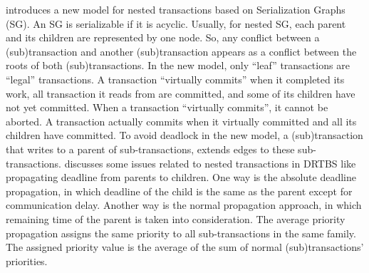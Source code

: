 \documentclass[letter]{sig-alternate}
\begin{document}
\cite{620423} introduces a new model for nested transactions based on Serialization Graphs (SG). 
An SG is serializable if it is acyclic. Usually, for nested SG, each parent and its children are represented by one node. So, any conflict between a (sub)transaction and another (sub)transaction appears as a conflict between the roots of both (sub)transactions. 
In the new model, only ``leaf'' transactions are ``legal'' transactions. 
A transaction ``virtually commits'' when it completed its work, all transaction it reads from are committed, and some of its children have not yet committed. When a transaction ``virtually commits'', it cannot be aborted. A transaction actually commits when it virtually committed and all its children have committed. 
To avoid deadlock in the new model, a (sub)transaction that writes to a parent of sub-transactions, extends edges to these sub-transactions. 
%
\cite{316159} discusses some issues related to nested transactions in DRTBS like propagating deadline from parents to children. 
One way is the absolute deadline propagation, in which deadline of the child is the same as the parent except for communication delay. 
Another way is the normal propagation approach, in which remaining time of the parent is taken into consideration. 
The average priority propagation assigns the same priority to all sub-transactions in the same family. The assigned priority value is the average of the sum of normal (sub)transactions' priorities.
\end{document}
